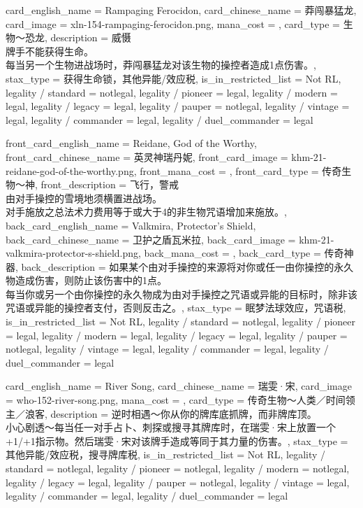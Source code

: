 \documentclass[lang = cn, color = black, 10pt]{AllThatStax}
\begin{document}
\card
{
	card_english_name = {Rampaging Ferocidon},
	card_chinese_name = {莽闯暴猛龙},
	card_image = xln-154-rampaging-ferocidon.png,
	mana_cost = ,
	card_type = 生物～恐龙,
	description = {威慑\\
牌手不能获得生命。\\
每当另一个生物进战场时，莽闯暴猛龙对该生物的操控者造成1点伤害。},
	stax_type = 获得生命锁，其他异能/效应税,
	is_in_restricted_list = Not RL,
	legality / standard = notlegal,
	legality / pioneer = legal,
	legality / modern = legal,
	legality / legacy = legal,
	legality / pauper = notlegal,
	legality / vintage = legal,
	legality / commander = legal,
	legality / duel_commander = legal
}

\mfcard
{
	front_card_english_name = {Reidane, God of the Worthy},
	front_card_chinese_name = {英灵神瑞丹妮},
	front_card_image = khm-21-reidane-god-of-the-worthy.png,
	front_mana_cost = ,
	front_card_type = 传奇生物～神,
	front_description = {飞行，警戒\\
由对手操控的雪境地须横置进战场。\\
对手施放之总法术力费用等于或大于4的非生物咒语增加来施放。},
	back_card_english_name = {Valkmira, Protector's Shield},
	back_card_chinese_name = {卫护之盾瓦米拉},
	back_card_image = khm-21-valkmira-protector-s-shield.png,
	back_mana_cost = ,
	back_card_type = 传奇神器,
	back_description = {如果某个由对手操控的来源将对你或任一由你操控的永久物造成伤害，则防止该伤害中的1点。\\
每当你或另一个由你操控的永久物成为由对手操控之咒语或异能的目标时，除非该咒语或异能的操控者支付，否则反击之。},
	stax_type = 眠梦法球效应，咒语税,
	is_in_restricted_list = Not RL,
	legality / standard = notlegal,
	legality / pioneer = legal,
	legality / modern = legal,
	legality / legacy = legal,
	legality / pauper = notlegal,
	legality / vintage = legal,
	legality / commander = legal,
	legality / duel_commander = legal
}

\card
{
	card_english_name = {River Song},
	card_chinese_name = {瑞雯·宋},
	card_image = who-152-river-song.png,
	mana_cost = ,
	card_type = 传奇生物～人类／时间领主／浪客,
	description = {逆时相遇～你从你的牌库底抓牌，而非牌库顶。\\
小心剧透～每当任一对手占卜、刺探或搜寻其牌库时，在瑞雯·宋上放置一个+1/+1指示物。然后瑞雯·宋对该牌手造成等同于其力量的伤害。},
	stax_type = 其他异能/效应税，搜寻牌库税,
	is_in_restricted_list = Not RL,
	legality / standard = notlegal,
	legality / pioneer = notlegal,
	legality / modern = notlegal,
	legality / legacy = legal,
	legality / pauper = notlegal,
	legality / vintage = legal,
	legality / commander = legal,
	legality / duel_commander = legal
}
\end{document}
